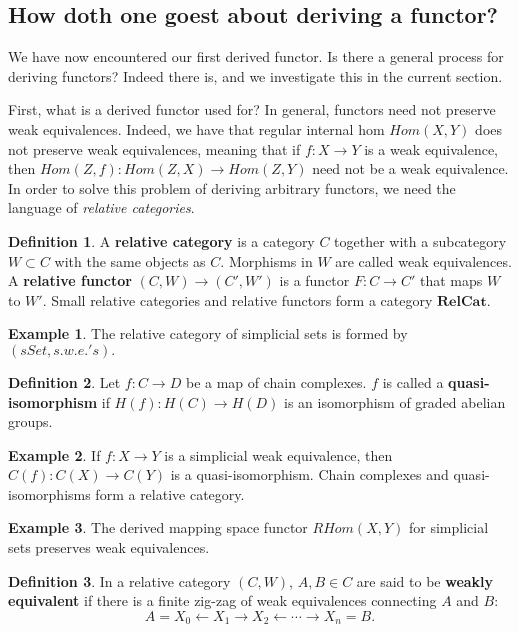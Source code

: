 \documentclass{article}
\theoremstyle{definition}
\newtheorem{ex}{Example}[section]
\newtheorem{defn}{Definition}[section]
\newcommand{\cat}[1]{\mathbf{#1}}
\begin{document}
\subsection{How doth one goest about deriving a functor?}
We have now encountered our first derived functor. Is there a general process for deriving functors? Indeed there is, and we investigate this in the current section. 

First, what is a derived functor used for? In general, functors need not preserve weak equivalences. Indeed, we have that regular internal hom $Hom(X,Y)$ does not preserve weak equivalences, meaning that if $f:X\rightarrow Y$ is a weak equivalence, then $Hom(Z,f):Hom(Z,X)\rightarrow Hom(Z,Y)$ need not be a weak equivalence. In order to solve this problem of deriving arbitrary functors, we need the language of \textit{relative categories}.
\begin{defn}
A \textbf{relative category} is a category $C$ together with a subcategory $W\subset C$ with the same objects as $C$. Morphisms in $W$ are called weak equivalences. A \textbf{relative functor} $(C,W)\rightarrow (C',W')$ is a functor $F:C\rightarrow C'$ that maps $W$ to $W'$. Small relative categories and relative functors form a category $\cat{RelCat}$.
\end{defn}
\begin{ex}
The relative category of simplicial sets is formed by $(sSet,s.w.e.'s).$
\end{ex}
\begin{defn}
Let $f:C\rightarrow D$ be a map of chain complexes. $f$ is called a \textbf{quasi-isomorphism} if $H(f):H(C)\rightarrow H(D)$ is an isomorphism of graded abelian groups. 
\end{defn}
\begin{ex}
If $f:X\rightarrow Y$ is a simplicial weak equivalence, then $C(f):C(X)\rightarrow C(Y)$ is a quasi-isomorphism. Chain complexes and quasi-isomorphisms form a relative category. 
\end{ex}
\begin{ex}
The derived mapping space functor $RHom(X,Y)$ for simplicial sets preserves weak equivalences. 
\end{ex}
\begin{defn}
In a relative category $(C,W)$, $A,B\in C$ are said to be \textbf{weakly equivalent} if there is a finite zig-zag of weak equivalences connecting $A$ and $B$: \[A=X_{0}\leftarrow X_{1}\rightarrow X_{2}\leftarrow\cdots\rightarrow X_{n}=B.\]
\end{defn}
\end{document}
